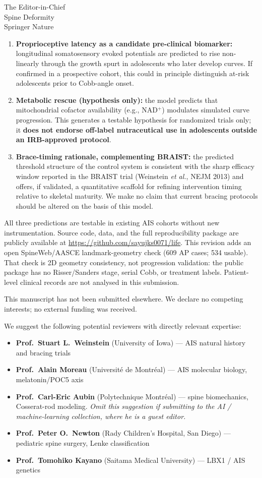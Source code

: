 \documentclass[12pt]{letter}
\begin{document}
\begin{letter}{The Editor-in-Chief\\Spine Deformity\\Springer Nature}
\begin{enumerate}
\item \textbf{Proprioceptive latency as a candidate pre-clinical biomarker:} longitudinal somatosensory evoked potentials are predicted to rise non-linearly through the growth spurt in adolescents who later develop curves. If confirmed in a prospective cohort, this could in principle distinguish at-risk adolescents prior to Cobb-angle onset.
\item \textbf{Metabolic rescue (hypothesis only):} the model predicts that mitochondrial cofactor availability (e.g., NAD$^+$) modulates simulated curve progression. This generates a testable hypothesis for randomized trials only; it \textbf{does not endorse off-label nutraceutical use in adolescents outside an IRB-approved protocol}.
\item \textbf{Brace-timing rationale, complementing BRAIST:} the predicted threshold structure of the control system is consistent with the sharp efficacy window reported in the BRAIST trial (Weinstein \emph{et al.}, NEJM 2013) and offers, if validated, a quantitative scaffold for refining intervention timing relative to skeletal maturity. We make no claim that current bracing protocols should be altered on the basis of this model.
\end{enumerate}

All three predictions are testable in existing AIS cohorts without new instrumentation. Source code, data, and the full reproducibility package are publicly available at \url{https://github.com/sayujks0071/life}. This revision adds an open SpineWeb/AASCE landmark-geometry check (609 AP cases; 534 usable). That check is 2D geometry consistency, not progression validation: the public package has no Risser/Sanders stage, serial Cobb, or treatment labels. Patient-level clinical records are not analysed in this submission.

This manuscript has not been submitted elsewhere. We declare no competing interests; no external funding was received.

We suggest the following potential reviewers with directly relevant expertise:

\begin{itemize}
\item \textbf{Prof.\ Stuart L.\ Weinstein} (University of Iowa) --- AIS natural history and bracing trials
\item \textbf{Prof.\ Alain Moreau} (Universit\'{e} de Montr\'{e}al) --- AIS molecular biology, melatonin/POC5 axis
\item \textbf{Prof.\ Carl-Eric Aubin} (Polytechnique Montr\'{e}al) --- spine biomechanics, Cosserat-rod modeling. \emph{Omit this suggestion if submitting to the AI / machine-learning collection, where he is a guest editor.}
\item \textbf{Prof.\ Peter O.\ Newton} (Rady Children's Hospital, San Diego) --- pediatric spine surgery, Lenke classification
\item \textbf{Prof.\ Tomohiko Kayano} (Saitama Medical University) --- LBX1 / AIS genetics
\end{itemize}


\end{letter}
\end{document}
